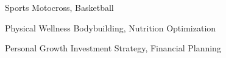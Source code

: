 

\begin{cvskills}

  \cvskill
  {Sports} %
  {Motocross, Basketball} %

  \cvskill
    {Physical Wellness} %
    {Bodybuilding, Nutrition Optimization} %

  \cvskill
    {Personal Growth} %
    {Investment Strategy, Financial Planning} %

\end{cvskills}
